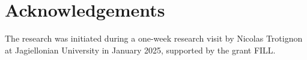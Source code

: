\documentclass[11pt,a4aper]{article}
\renewcommand{\geq}{\geqslant}
\renewcommand{\leq}{\leqslant}
\begin{document}




\section*{Acknowledgements}
The research was initiated during a one-week research visit by Nicolas Trotignon
at Jagiellonian University in January 2025, supported by the grant FILL.

\nocite{*}



\end{document}

